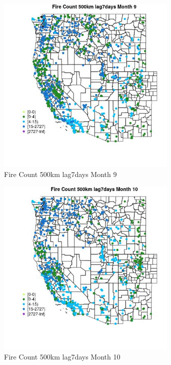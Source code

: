 \begin{figure} 
\centering  
\includegraphics[width=0.77\textwidth]{Code_Outputs/Report_ML_input_PM25_Step4_part_f_de_duplicated_aves_prioritize_24hr_obswNAs_MapObsMo9Fire_Count_500km_lag7days.jpg} 
\caption{\label{fig:Report_ML_input_PM25_Step4_part_f_de_duplicated_aves_prioritize_24hr_obswNAsMapObsMo9Fire_Count_500km_lag7days}Fire Count 500km lag7days Month 9} 
\end{figure} 
 

\begin{figure} 
\centering  
\includegraphics[width=0.77\textwidth]{Code_Outputs/Report_ML_input_PM25_Step4_part_f_de_duplicated_aves_prioritize_24hr_obswNAs_MapObsMo10Fire_Count_500km_lag7days.jpg} 
\caption{\label{fig:Report_ML_input_PM25_Step4_part_f_de_duplicated_aves_prioritize_24hr_obswNAsMapObsMo10Fire_Count_500km_lag7days}Fire Count 500km lag7days Month 10} 
\end{figure} 
 

